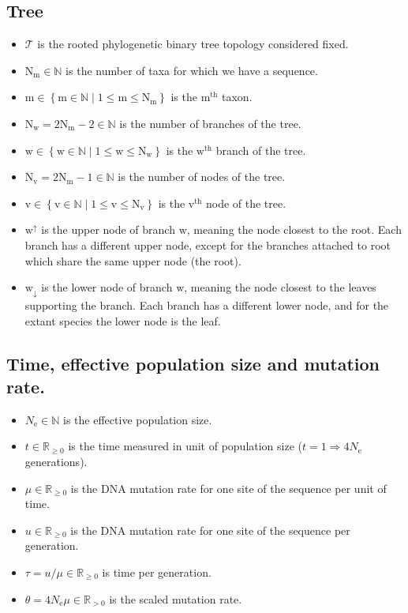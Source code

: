 \documentclass{article}
\newcommand{\taxon}{\text{m}}
\newcommand{\Ntaxa}{\text{N}_{\taxon}}
\newcommand{\branch}{\text{w}}
\newcommand{\Nbranch}{\text{N}_{\branch}}
\newcommand{\up}{\branch^{\uparrow}}
\newcommand{\down}{\branch_{\downarrow}}
\newcommand{\node}{\text{v}}
\newcommand{\Nnode}{\text{N}_{\node}}
\newcommand{\e}{\mathrm{e}}
\newcommand{\Ne}{N_\e}
\newcommand{\Tree}{\mathcal{T}}
\begin{document}
\subsection{Tree}
\begin{itemize}
	\setlength\itemsep{-0.25em}
	\item $\Tree$ is the rooted phylogenetic binary tree topology considered fixed.
	\item $\Ntaxa \in \mathbb{N}$ is the number of taxa for which we have a sequence.
	\item $\taxon \in \left\{ \taxon \in \mathbb{N} \mid 1 \leq \taxon \leq \Ntaxa \right\}$ is the $\taxon^{\mathrm{th}}$ taxon.
	\item $\Nbranch = 2 \Ntaxa - 2 \in \mathbb{N}$ is the number of branches of the tree.
	\item $\branch \in \left\{ \branch \in \mathbb{N} \mid 1 \leq \branch \leq \Nbranch \right\}$ is the $\branch^{\mathrm{th}}$ branch of the tree.
	\item $\Nnode = 2 \Ntaxa - 1 \in \mathbb{N}$ is the number of nodes of the tree.
	\item $\node \in \left\{ \node \in \mathbb{N} \mid 1 \leq \node \leq \Nnode \right\}$ is the $\node^{\mathrm{th}}$ node of the tree.
	\item $\up$ is the upper node of branch $\branch$, meaning the node closest to the root. Each branch has a different upper node, except for the branches attached to root which share the same upper node (the root).
	\item $\down$ is the lower node of branch $\branch$, meaning the node closest to the leaves supporting the branch. Each branch has a different lower node, and for the extant species the lower node is the leaf.
\end{itemize}


\subsection{Time, effective population size and mutation rate.}
\begin{itemize}
	\setlength\itemsep{-0.25em}
	\item $\Ne \in \mathbb{N}$ is the effective population size.
	\item $t \in \mathbb{R}_{\geq 0}$ is the time measured in unit of population size ($t=1 \Rightarrow 4 \Ne $ generations).
	\item $\mu \in \mathbb{R}_{\geq 0}$ is the DNA mutation rate for one site of the sequence per unit of time.
	\item $u \in \mathbb{R}_{\geq 0}$ is the DNA mutation rate for one site of the sequence per generation.
	\item $\tau = u / \mu \in \mathbb{R}_{\geq 0}$ is time per generation.
	\item $\theta=4 \Ne \mu \in \mathbb{R}_{>0} $ is the scaled mutation rate.
\end{itemize}
\end{document}
